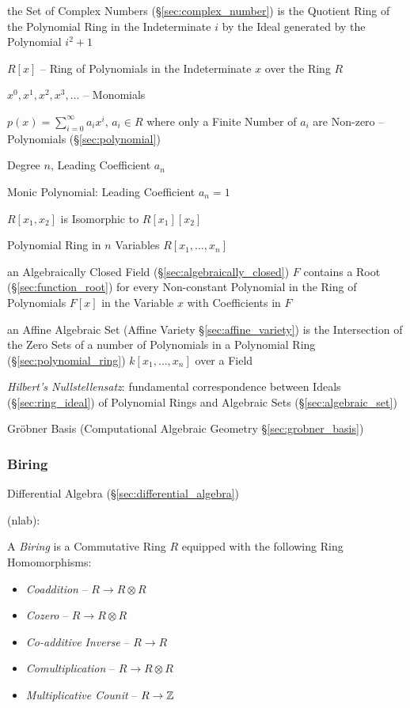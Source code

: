 the Set of Complex Numbers (\S\ref{sec:complex_number}) is the Quotient Ring of
the Polynomial Ring in the Indeterminate $i$ by the Ideal generated by the
Polynomial $i^2 + 1$

$R[x]$ -- Ring of Polynomials in the Indeterminate $x$ over the Ring $R$

$x^0, x^1, x^2, x^3, \ldots$ -- Monomials

$p(x) = \sum_{i=0}^\infty a_i x^i$, $a_i \in R$ where only a Finite Number of
$a_i$ are Non-zero -- Polynomials (\S\ref{sec:polynomial})

Degree $n$, Leading Coefficient $a_n$

Monic Polynomial: Leading Coefficient $a_n = 1$

$R[x_1, x_2]$ is Isomorphic to $R[x_1][x_2]$

Polynomial Ring in $n$ Variables $R[x_1, \ldots, x_n]$

an Algebraically Closed Field (\S\ref{sec:algebraically_closed}) $F$ contains a
Root (\S\ref{sec:function_root}) for every Non-constant Polynomial in the Ring
of Polynomials $F[x]$ in the Variable $x$ with Coefficients in $F$

an Affine Algebraic Set (Affine Variety \S\ref{sec:affine_variety}) is the
Intersection of the Zero Sets of a number of Polynomials in a Polynomial Ring
(\S\ref{sec:polynomial_ring}) $k[x_1,\ldots,x_n]$ over a Field

\emph{Hilbert's Nullstellensatz}: fundamental correspondence between Ideals
(\S\ref{sec:ring_ideal}) of Polynomial Rings and Algebraic Sets
(\S\ref{sec:algebraic_set})

\fist Gr\"obner Basis (Computational Algebraic Geometry
\S\ref{sec:grobner_basis})



\subsubsection{Biring}\label{sec:biring}

\fist Differential Algebra (\S\ref{sec:differential_algebra})

(nlab):

A \emph{Biring} is a Commutative Ring $R$ equipped with the following Ring
Homomorphisms:
\begin{itemize}
  \item \emph{Coaddition} -- $R \rightarrow R \otimes R$
  \item \emph{Cozero} -- $R \rightarrow R \otimes R$
  \item \emph{Co-additive Inverse} -- $R \rightarrow R$
  \item \emph{Comultiplication} -- $R \rightarrow R \otimes R$
  \item \emph{Multiplicative Counit} -- $R \rightarrow \mathbb{Z}$
\end{itemize}

